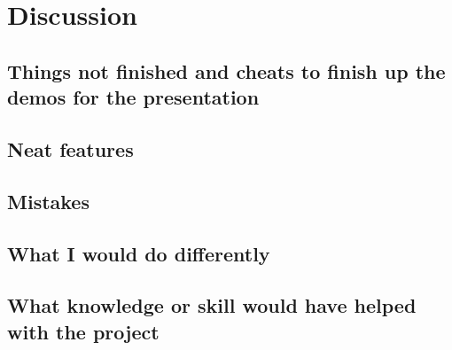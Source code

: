 \documentclass[letterpaper]{article}
\begin{document}
\section{Discussion}

\subsection{Things not finished and cheats to finish up the demos for the presentation}
\subsection{Neat features}
\subsection{Mistakes}
\subsection{What I would do differently}
\subsection{What knowledge or skill would have helped with the project}

%
%
%
%
%   
\end{document}
